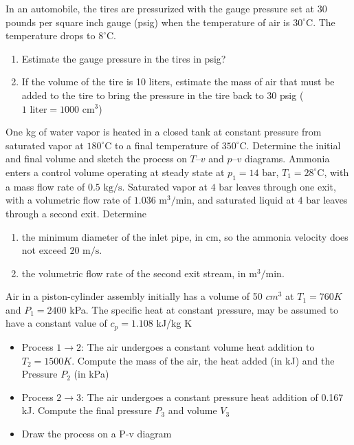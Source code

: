 \documentclass[12pt]{exam}
\begin{document}
\begin{questions}
		\question[10] In an automobile, the tires are pressurized with the gauge pressure set at 30 pounds per square inch gauge (psig) when the temperature of air is $30^\circ\text{C}$. The temperature drops to $8^\circ\text{C}$.
			\begin{enumerate}
				\item[(a)] Estimate the gauge pressure in the tires in psig?
				\item[(b)] If the volume of the tire is 10 liters, estimate the mass of air that must be added to the tire to bring the pressure in the tire back to 30 psig ($1\text{ liter} = 1000\text{ cm}^3$)
			\end{enumerate}
		\question[10] One kg of water vapor is heated in a closed tank at constant pressure from saturated vapor at $180^\circ\text{C}$ to a final temperature of $350^\circ\text{C}$. Determine the initial and final volume and sketch the process on $T\text{--}v$ and $p\text{--}v$ diagrams.
		\question[10] Ammonia enters a control volume operating at steady state at $p_1 = 14 \text{ bar}$, $T_1 = 28^\circ\text{C}$, with a mass flow rate of $0.5 \text{ kg/s}$. Saturated vapor at $4 \text{ bar}$ leaves through one exit, with a volumetric flow rate of $1.036 \text{ m}^3\text{/min}$, and saturated liquid at $4 \text{ bar}$ leaves through a second exit. Determine
			\begin{enumerate}
				\item[(a)] the minimum diameter of the inlet pipe, in cm, so the ammonia velocity does not exceed $20 \text{ m/s}$.
				\item[(b)] the volumetric flow rate of the second exit stream, in $\text{m}^3\text{/min}$.
			\end{enumerate}
		\question[18] Air in a piston-cylinder assembly initially has a volume of 50 $cm^3$ at $T_1=760 K$ and  $P_1=2400$ kPa. The specific heat at constant pressure, may be assumed to have a constant value of $c_p=1.108$ kJ/kg K
			\begin{itemize}
				\item Process $1\to 2$: The air undergoes a constant volume heat addition to $T_2=1500 K$. Compute the mass of the air, the heat added (in kJ) and the Pressure $P_2$ (in kPa)
				\item Process $2\to 3$: The air undergoes a constant pressure heat addition of 0.167 kJ. Compute the final pressure $P_3$ and volume $V_3$  
				\item Draw the process on a P-v diagram
			\end{itemize}
			


\end{questions}
\end{document}
